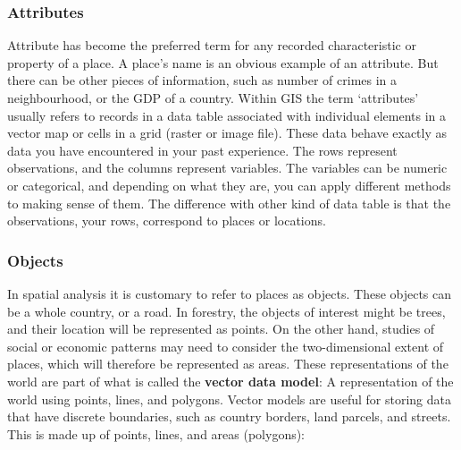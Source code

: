 \documentclass[
]{book}
\begin{document}
\hypertarget{attributes}{%
\subsubsection{Attributes}\label{attributes}}

Attribute has become the preferred term for any recorded characteristic or property of a place. A place's name is an obvious example of an attribute. But there can be other pieces of information, such as number of crimes in a neighbourhood, or the GDP of a country. Within GIS the term `attributes' usually refers to records in a data table associated with individual elements in a vector map or cells in a grid (raster or image file). These data behave exactly as data you have encountered in your past experience. The rows represent observations, and the columns represent variables. The variables can be numeric or categorical, and depending on what they are, you can apply different methods to making sense of them. The difference with other kind of data table is that the observations, your rows, correspond to places or locations.

\hypertarget{objects-1}{%
\subsubsection{Objects}\label{objects-1}}

In spatial analysis it is customary to refer to places as objects. These objects can be a whole country, or a road. In forestry, the objects of interest might be trees, and their location will be represented as points. On the other hand, studies of social or economic patterns may need to consider the two-dimensional extent of places, which will therefore be represented as areas. These representations of the world are part of what is called the \textbf{vector data model}: A representation of the world using points, lines, and polygons. Vector models are useful for storing data that have discrete boundaries, such as country borders, land parcels, and streets. This is made up of points, lines, and areas (polygons):
\end{document}

